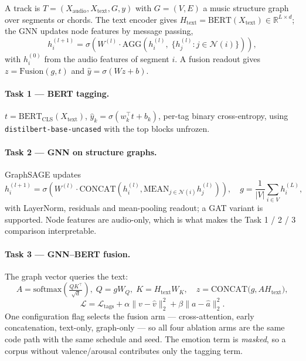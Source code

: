 \documentclass[10pt]{article}
\begin{document}
A track is $T = (X_{\text{audio}}, X_{\text{text}}, G, y)$ with $G=(V,E)$ a
music structure graph over segments or chords. The text encoder gives
$H_{\text{text}} = \mathrm{BERT}(X_{\text{text}}) \in \mathbb{R}^{L\times d}$;
the GNN updates node features by message passing,
\begin{equation}
h_i^{(l+1)} = \sigma\!\left( W^{(l)} \cdot \mathrm{AGG}\!\left(
  h_i^{(l)},\; \{ h_j^{(l)} : j \in \mathcal{N}(i) \}\right)\right),
\label{eq:mp}
\end{equation}
with $h_i^{(0)}$ from the audio features of segment $i$. A fusion readout gives
$z = \mathrm{Fusion}(g,t)$ and $\hat{y} = \sigma(Wz+b)$.

\paragraph{Task 1 --- BERT tagging.}
$t = \mathrm{BERT}_{\text{CLS}}(X_{\text{text}})$,
$\hat{y}_k = \sigma(w_k^\top t + b_k)$, per-tag binary cross-entropy, using
\texttt{distilbert-base-uncased} with the top blocks unfrozen.

\paragraph{Task 2 --- GNN on structure graphs.} GraphSAGE updates
\begin{equation}
h_i^{(l+1)} = \sigma\!\left(W^{(l)}\!\cdot\! \mathrm{CONCAT}\!\left(
  h_i^{(l)}, \mathrm{MEAN}_{j\in\mathcal{N}(i)} h_j^{(l)}\right)\right),
\quad
g = \frac{1}{|V|}\sum_{i\in V} h_i^{(L)},
\label{eq:sage}
\end{equation}
with LayerNorm, residuals and mean-pooling readout; a GAT variant is supported.
Node features are audio-only, which is what makes the Task 1 / 2 / 3 comparison
interpretable.

\paragraph{Task 3 --- GNN--BERT fusion.} The graph vector queries the text:
\begin{equation}
A = \mathrm{softmax}\!\left(\tfrac{QK^\top}{\sqrt{d}}\right),\;
Q = gW_Q,\; K = H_{\text{text}}W_K,\quad
z = \mathrm{CONCAT}\big(g, A H_{\text{text}}\big),
\label{eq:xattn}
\end{equation}
\begin{equation}
\mathcal{L} = \mathcal{L}_{\text{tags}}
 + \alpha\lVert v-\hat{v}\rVert_2^2 + \beta \lVert a-\hat{a}\rVert_2^2 .
\label{eq:multitask}
\end{equation}
One configuration flag selects the fusion arm --- cross-attention, early
concatenation, text-only, graph-only --- so all four ablation arms are the same
code path with the same schedule and seed. The emotion term is \emph{masked}, so
a corpus without valence/arousal contributes only the tagging term.
\end{document}
